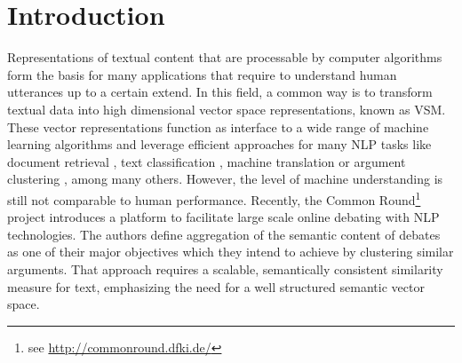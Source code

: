 \section{Introduction} %

Representations of textual content that are processable by computer algorithms form the basis for many applications that require to understand human utterances up to a certain extend. In this field, a common way is to transform textual data into high dimensional vector space representations, known as \ac{VSM}\autocite{salton_vector_1975}. These vector representations function as interface to a wide range of machine learning algorithms and leverage efficient approaches for many \ac{NLP} tasks like document retrieval \autocite{manning_introduction_2008}, text classification \autocite{sahami_bayesian_1998}, machine translation \autocite{wu_googles_2016} or argument clustering \autocite{boltuzic_identifying_2015}, among many others. However, the level of machine understanding is still not comparable to human performance. Recently, the Common Round\footnote{see \url{http://commonround.dfki.de/}} project \autocite{uszkoreit_common_2017} introduces a platform to facilitate large scale online debating with \ac{NLP} technologies. The authors define aggregation of the semantic content of debates as one of their major objectives which they intend to achieve by clustering similar arguments. That approach requires a scalable, semantically consistent similarity measure for text, emphasizing the need for a well structured semantic vector space. 

